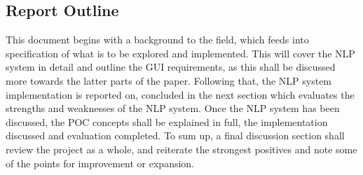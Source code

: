 \subsection{Report Outline}

This document begins with a background to the field, which feeds into specification of what is to be explored and implemented. This will cover the NLP system in detail and outline the GUI requirements, as this shall be discussed more towards the latter parts of the paper. Following that, the NLP system implementation is reported on, concluded in the next section which evaluates the strengths and weaknesses of the NLP system. Once the NLP system has been discussed, the POC concepts shall be explained in full, the implementation discussed and evaluation completed. To sum up, a final discussion section shall review the project as a whole, and reiterate the strongest positives and note some of the points for improvement or expansion.


